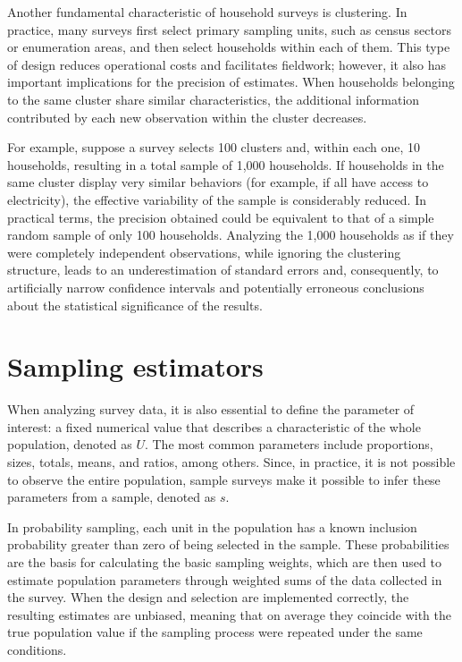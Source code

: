 \documentclass[
  english,
  12pt,
]{book}
\begin{document}
Another fundamental characteristic of household surveys is clustering. In practice, many surveys first select primary sampling units, such as census sectors or enumeration areas, and then select households within each of them. This type of design reduces operational costs and facilitates fieldwork; however, it also has important implications for the precision of estimates. When households belonging to the same cluster share similar characteristics, the additional information contributed by each new observation within the cluster decreases.

For example, suppose a survey selects 100 clusters and, within each one, 10 households, resulting in a total sample of 1,000 households. If households in the same cluster display very similar behaviors (for example, if all have access to electricity), the effective variability of the sample is considerably reduced. In practical terms, the precision obtained could be equivalent to that of a simple random sample of only 100 households. Analyzing the 1,000 households as if they were completely independent observations, while ignoring the clustering structure, leads to an underestimation of standard errors and, consequently, to artificially narrow confidence intervals and potentially erroneous conclusions about the statistical significance of the results.

\section{Sampling estimators}\label{estimadores-de-muestreo}

When analyzing survey data, it is also essential to define the parameter of interest: a fixed numerical value that describes a characteristic of the whole population, denoted as \(U\). The most common parameters include proportions, sizes, totals, means, and ratios, among others. Since, in practice, it is not possible to observe the entire population, sample surveys make it possible to infer these parameters from a sample, denoted as \(s\).

In probability sampling, each unit in the population has a known inclusion probability greater than zero of being selected in the sample. These probabilities are the basis for calculating the basic sampling weights, which are then used to estimate population parameters through weighted sums of the data collected in the survey. When the design and selection are implemented correctly, the resulting estimates are unbiased, meaning that on average they coincide with the true population value if the sampling process were repeated under the same conditions.
\end{document}
